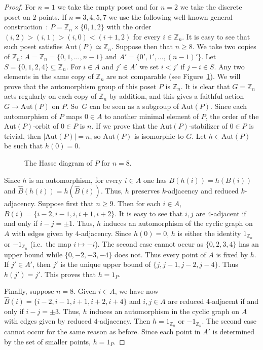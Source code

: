 \documentclass[10pt,a4paper]{amsart}
\newcommand{\ie}{i.e.\ }
\renewcommand{\varphi}{h}
\newcommand{\Z}{\mathbb{Z}}
\newcommand{\aut}{\textrm{Aut}}
\theoremstyle{plain}
\theoremstyle{definition}
\theoremstyle{remark}
\begin{document}
\begin{proof}
For $n=1$ we take the empty poset and for $n=2$ we take the discrete poset on $2$ points. If $n=3,4,5,7$ we use the following well-known general construction~\cite{Fru50}: $P=\Z_{n}\times \{0,1,2\}$ with the order $(i,2)>(i,1)>(i,0)<(i+1,2)$ for every $i\in \Z_{n}$. It is easy to see that such poset satisfies $\aut(P) \simeq \Z_{n}$. Suppose then that $n\ge 8$. We take two copies of $\Z_{n}$: $A=\Z_{n}=\{0,1,\ldots, n-1\}$ and $A'=\{0',1',\ldots, (n-1)'\}$. Let $S=\{0,1,2,4\}\subseteq \Z_{n}$. For $i\in A$ and $j'\in A'$ we set $i<j'$ if $j-i\in S$. Any two elements in the same copy of $\Z_n$ are not comparable (see Figure~\ref{fig0124}). We will prove that the automorphism group of this poset $P$ is $\Z_{n}$. It is clear that $G=\Z_n$ acts regularly on each copy of $\Z_n$ by addition, and this gives a faithful action $G\to \aut(P)$ on $P$. So~$G$ can be seen as a subgroup of $\aut(P)$. Since each automorphism of $P$ maps $0\in A$ to another minimal element of $P$, the order of the $\aut(P)$-orbit of $0\in P$ is $n$. If we prove that the $\aut(P)$-stabilizer of $0\in P$ is trivial, then $|\aut(P)|=n$, so $\aut(P)$ is isomorphic to $G$. Let $\varphi \in \aut(P)$ be such that $\varphi (0)=0$.

\begin{figure}[h] 
\begin{center}


\caption{The Hasse diagram of $P$ for $n=8$.}\label{fig0124}
\end{center}
\end{figure}

Since $\varphi$ is an automorphism, for every $i\in A$ one has $B(\varphi(i))=\varphi (B(i))$ and $\hat{B}(\varphi(i))=\varphi (\hat{B}(i))$. Thus, $\varphi$ preserves $k$-adjacency and reduced $k$-adjacency. Suppose first that $n\ge 9$. Then for each $i\in A$, $B(i)=\{i-2,i-1,i,i+1,i+2\}$. It is easy to see that $i,j$ are $4$-adjacent if and only if $i-j=\pm 1$. Thus, $\varphi$ induces an automorphism of the cyclic graph on $A$ with edges given by $4$-adjacency. Since $\varphi(0)=0$, $\varphi$ is either the identity $1_{\Z_n}$ or $-1_{\Z_n}$ (\ie the map $i\mapsto -i$). The second case cannot occur as $\{0,2,3,4\}$ has an upper bound while $\{0,-2,-3,-4\}$ does not. Thus every point of $A$ is fixed by $\varphi$. If $j'\in A'$, then $j'$ is the unique upper bound of $\{j,j-1,j-2,j-4\}$. Thus $\varphi(j')=j'$. This proves that $\varphi=1_P$. 

Finally, suppose $n=8$. Given $i\in A$, we have now $\hat{B}(i)=\{i-2,i-1,i+1,i+2, i+4\}$ and $i,j\in A$ are reduced $4$-adjacent if and only if $i-j=\pm 3$. Thus, $\varphi$ induces an automorphism in the cyclic graph on $A$ with edges given by reduced $4$-adjacency. Then $\varphi=1_{\Z_n}$ or $-1_{\Z_n}$. The second case cannot occur for the same reason as before. Since each point in $A'$ is determined by the set of smaller points, $\varphi=1_P$.    
\end{proof}
\end{document}
